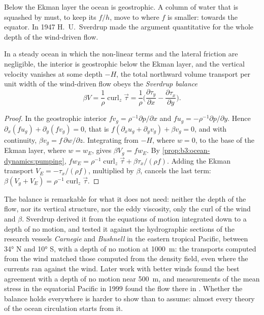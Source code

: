 Below the Ekman layer the ocean is geostrophic. A column of water that is
squashed by  must, to keep its  $f/h$,
move to where $f$ is smaller: towards the equator. In 1947 H.~U.~Sverdrup
made the argument quantitative for the whole depth of the wind-driven flow.

\begin{theorem}\label{thm:b3:ocean-dynamics:sverdrup}
In a steady ocean in which the non-linear terms and the lateral friction
are negligible, the interior is geostrophic below the Ekman layer, and the
vertical velocity vanishes at some depth $-H$, the total northward volume
transport per unit width of the wind-driven flow obeys the \emph{Sverdrup
balance}
\[
\beta V = \frac{1}{\rho}\operatorname{curl}_z\vec\tau
= \frac{1}{\rho}\Big(\frac{\partial\tau_y}{\partial x} -
\frac{\partial\tau_x}{\partial y}\Big) .
\]
\end{theorem}

\begin{proof}
In the geostrophic interior $fv_g = \rho^{-1}\partial p/\partial x$ and
$fu_g = -\rho^{-1}\partial p/\partial y$. Hence $\partial_x(fu_g) +
\partial_y(fv_g) = 0$, that is $f(\partial_xu_g + \partial_yv_g) + \beta
v_g = 0$, and with continuity, $\beta v_g = f\,\partial w/\partial z$.
Integrating from $-H$, where $w = 0$, to the base of the Ekman layer,
where $w = w_E$, gives $\beta V_g = fw_E$. By
\cref{prop:b3:ocean-dynamics:pumping}, $fw_E = \rho^{-1}\operatorname{curl}_z
\vec\tau + \beta\tau_x/(\rho f)$. Adding the Ekman transport $V_E =
-\tau_x/(\rho f)$, multiplied by $\beta$, cancels the last term:
$\beta(V_g + V_E) = \rho^{-1}\operatorname{curl}_z\vec\tau$.
\end{proof}

The balance is remarkable for what it does not need: neither the depth of
the flow, nor its vertical structure, nor the eddy viscosity, only the
curl of the wind and $\beta$. Sverdrup derived it from the equations of
motion integrated down to a depth of no motion, and tested it against the
hydrographic sections of the research vessels \emph{Carnegie} and
\emph{Bushnell} in the eastern tropical Pacific, between \ang{34} N and
\ang{10} S, with a depth of no motion at \qty{1000}{m}: the transports
computed from the wind matched those computed from the density field, even
where the currents ran against the wind. Later work with better winds
found the best agreement with a depth of no motion near \qty{500}{m}, and
measurements of the mean stress in the equatorial Pacific in 1999 found the
flow there in . Whether the balance holds everywhere is
harder to show than to assume: almost every theory of the ocean
circulation starts from it.

